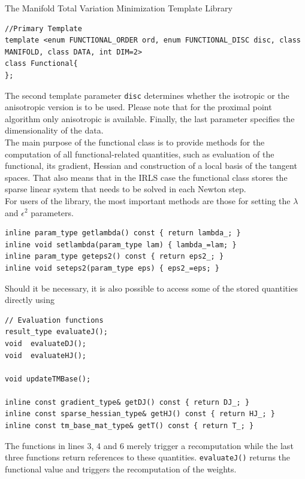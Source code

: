 \begin{chapter}{The Manifold Total Variation Minimization Template Library}
\cppinline
\begin{lstlisting}
//Primary Template
template <enum FUNCTIONAL_ORDER ord, enum FUNCTIONAL_DISC disc, class MANIFOLD, class DATA, int DIM=2>
class Functional{
};
\end{lstlisting}

The second template parameter \texttt{disc} determines whether the isotropic or the anisotropic version is to be used. Please note that for the proximal point algorithm only
anisotropic is available. Finally, the last parameter specifies the dimensionality of the data. \\
The main purpose of the functional class is to provide methods for the computation of all functional-related quantities, such as evaluation of the functional, its gradient,
Hessian and construction of a local basis of the tangent spaces. That also means that in the IRLS case the functional class stores the sparse linear system that needs to be solved
in each Newton step.\\

For users of the library, the most important methods are those for setting the $\lambda$ and $\epsilon^2$ parameters.
\cppinline
\begin{lstlisting}
inline param_type getlambda() const { return lambda_; }
inline void setlambda(param_type lam) { lambda_=lam; }
inline param_type geteps2() const { return eps2_; }
inline void seteps2(param_type eps) { eps2_=eps; }
\end{lstlisting}

Should it be necessary, it is also possible to access some of the stored quantities directly using
\cppinline
\begin{lstlisting}
// Evaluation functions
result_type evaluateJ();
void  evaluateDJ();
void  evaluateHJ();
 
void updateTMBase();

inline const gradient_type& getDJ() const { return DJ_; }
inline const sparse_hessian_type& getHJ() const { return HJ_; }
inline const tm_base_mat_type& getT() const { return T_; }
\end{lstlisting}
The functions in lines 3, 4 and 6 merely trigger a recomputation while the last three functions return references to these quantities. \texttt{evaluateJ()} returns the functional value and triggers the 
recomputation of the weights.




\end{chapter}

